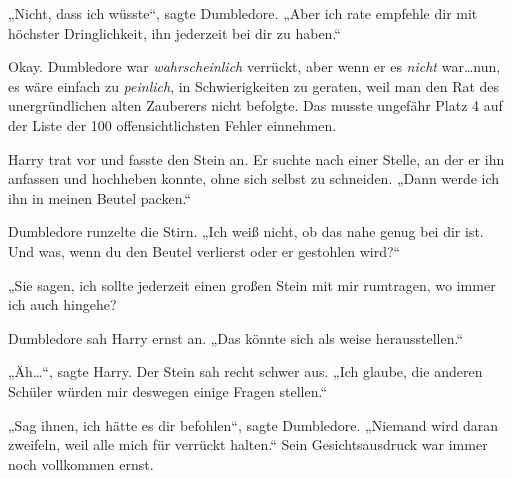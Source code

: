 „Nicht, dass ich wüsste“, sagte Dumbledore. „Aber ich rate empfehle dir mit höchster Dringlichkeit, ihn jederzeit bei dir zu haben.“

Okay. Dumbledore war \emph{wahrscheinlich} verrückt, aber wenn er es \emph{nicht} war…nun, es wäre einfach zu \emph{peinlich}, in Schwierigkeiten zu geraten, weil man den Rat des unergründlichen alten Zauberers nicht befolgte. Das musste ungefähr Platz 4 auf der Liste der 100 offensichtlichsten Fehler einnehmen.

Harry trat vor und fasste den Stein an. Er suchte nach einer Stelle, an der er ihn anfassen und hochheben konnte, ohne sich selbst zu schneiden. „Dann werde ich ihn in meinen Beutel packen.“

Dumbledore runzelte die Stirn. „Ich weiß nicht, ob das nahe genug bei dir ist. Und was, wenn du den Beutel verlierst oder er gestohlen wird?“

„Sie sagen, ich sollte jederzeit einen großen Stein mit mir rumtragen, wo immer ich auch hingehe?

Dumbledore sah Harry ernst an. „Das könnte sich als weise herausstellen.“

„Äh…“, sagte Harry. Der Stein sah recht schwer aus. „Ich glaube, die anderen Schüler würden mir deswegen einige Fragen stellen.“

„Sag ihnen, ich hätte es dir befohlen“, sagte Dumbledore. „Niemand wird daran zweifeln, weil alle mich für verrückt halten.“ Sein Gesichtsausdruck war immer noch vollkommen ernst.

